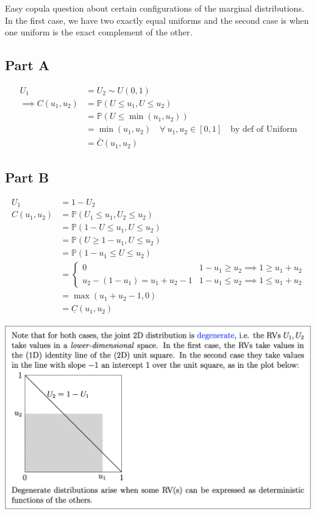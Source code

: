 \documentclass[
  oneside]{book}
\begin{document}
Easy copula question about certain configurations of the marginal distributions. In the first case, we have two exactly equal uniforms and the second case is when one uniform is the exact complement of the other.

\hypertarget{part-a-3}{%
\subsection{Part A}\label{part-a-3}}

\[
\begin{aligned}
U_{1} &= U_{2} \sim U(0,1)\\
\implies C(u_{1},u_{2}) &= \mathbb{P}(U \leq u_{1},U \leq u_{2})\\
&= \mathbb{P}(U \leq \min(u_{1},u_{2}))\\
&= \min(u_{1},u_{2}) \quad \forall \ u_{1},u_{2} \in [0,1]\quad \text{by def of Uniform}\\
&= \bar{C}(u_{1},u_{2})
\end{aligned}
\]

\hypertarget{part-b-3}{%
\subsection{Part B}\label{part-b-3}}

\[
\begin{aligned}
U_{1} &= 1 - U_{2}\\
C(u_{1},u_{2}) &= \mathbb{P}(U_{1} \leq u_{1}, U_{2} \leq u_{2})\\
&= \mathbb{P}(1-U \leq u_{1}, U \leq u_{2})\\
&= \mathbb{P}(U \geq 1-u_{1}, U \leq u_{2})\\
&= \mathbb{P}(1-u_{1} \leq U \leq u_{2})\\
&= \begin{cases}
0 & 1-u_{1} \geq u_{2} \implies 1\geq u_{1}+u_{2}\\
u_{2}-(1-u_{1}) = u_{1}+u_{2}-1 & 1-u_{1}\leq u_{2} \implies 1 \leq u_{1}+u_{2}
\end{cases}\\
&= \max(u_{1}+u_{2}-1, 0)\\
&= \underline{C}(u_{1},u_{2})
\end{aligned}
\]

\includegraphics{ProblemSets/Obsidian-Attachments/PS3.png}
\end{document}

